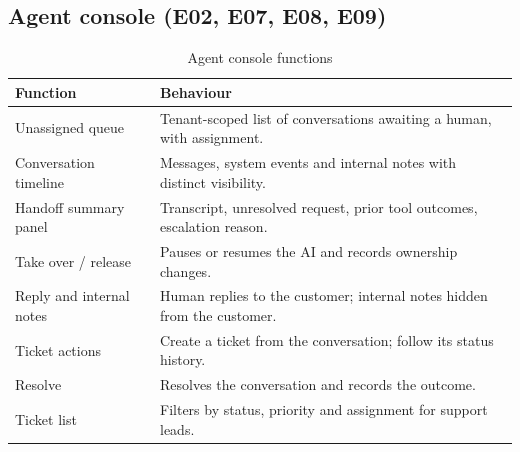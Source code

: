 \subsection{Agent console (E02, E07, E08, E09)}
\begin{table}[htbp]
\centering\caption{Agent console functions}\label{tab:console}
\begin{tabular}{@{}p{4.2cm}p{11.8cm}@{}}
\toprule \textbf{Function} & \textbf{Behaviour} \\ \midrule
Unassigned queue & Tenant-scoped list of conversations awaiting a human, with assignment. \\
Conversation timeline & Messages, system events and internal notes with distinct visibility. \\
Handoff summary panel & Transcript, unresolved request, prior tool outcomes, escalation reason. \\
Take over / release & Pauses or resumes the AI and records ownership changes. \\
Reply and internal notes & Human replies to the customer; internal notes hidden from the customer. \\
Ticket actions & Create a ticket from the conversation; follow its status history. \\
Resolve & Resolves the conversation and records the outcome. \\
Ticket list & Filters by status, priority and assignment for support leads. \\
\bottomrule
\end{tabular}
\end{table}

